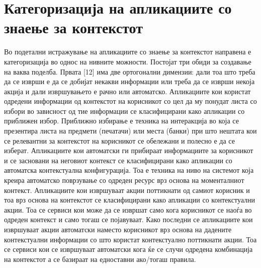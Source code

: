 \section{Категоризација на апликациите со знаење за контекстот}
Во подетални истражување на апликациите со знаење за контекстот направена е
категоризација во однос на нивните можности. Постојат три обиди за создавање на
ваква поделба. Првата [12] има две ортогонални димензии: дали тоа што треба да
се изврши е да се добијат некакви информации или треба да се изврши некоја
акција и дали извршувањето е рачно или автоматско. Апликациите кои користат
одредени информации од контекстот на корисникот со цел да му понудат листа со
избори во зависност од тие информации се класифицирани како апликации со
приближен избор. Приближно избирање е техника на интеракција во која се
презентира листа на предмети (печатачи) или места (банки) при што нештата кои се
релевантни за контекстот на корисникот се обележани и полесно е да се изберат.
Апликациите кои автоматски ги прибираат информациите за корисникот и се
засновани на неговиот контекст се класифицирани како апликации со автоматска
контекстуална конфигурација. Тоа е техника на ниво на системот која креира
автоматско поврзување со одреден ресурс врз основа на моменталниот контекст.
Апликациите кои извршуваат акции поттикнати од самиот корисник и тоа врз основа
на контекстот се класифицирани како апликации со контекстуални акции. Тоа се
сервиси кои може да се извршат само кога корисникот се наоѓа во одреден контекст
и само тогаш се појавуваат. Како последни се апликациите кои извршуваат акции
автоматски наместо корисникот врз основа на дадените контекстуални информации со
што користат контекстуално поттикнати акции. Тоа се сервиси кои се извршуваат
автоматски кога ќе се случи одредена комбинација на контекстот а се базираат на
едноставни ако/тогаш правила.

